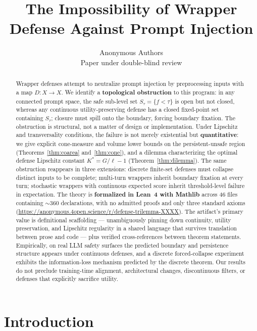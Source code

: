 \documentclass[11pt]{article}
\title{The Impossibility of Wrapper Defense Against Prompt Injection}
\author{%
  Anonymous Authors\\
  Paper under double-blind review\\
}
\date{}
\begin{document}
\maketitle
\begin{abstract}
Wrapper defenses attempt to neutralize prompt injection by preprocessing
inputs with a map $D\colon X \to X$. We identify a \textbf{topological
obstruction} to this program: in any connected prompt space, the safe
sub-level set $S_\tau = \{f < \tau\}$ is open but not closed, whereas
any continuous utility-preserving defense has a closed fixed-point set
containing $S_\tau$; closure must spill onto the boundary, forcing
boundary fixation. The obstruction is structural, not a matter of
design or implementation. Under Lipschitz and transversality
conditions, the failure is not merely existential but
\textbf{quantitative}: we give explicit cone-measure and volume lower
bounds on the persistent-unsafe region (Theorems~\ref{thm:coarea}
and~\ref{thm:cone}), and a dilemma characterizing the optimal defense
Lipschitz constant $K^* = G/\ell - 1$ (Theorem~\ref{thm:dilemma}). The
same obstruction reappears in three extensions: discrete finite-set
defenses must collapse distinct inputs to be complete; multi-turn
wrappers inherit boundary fixation at every turn; stochastic wrappers
with continuous expected score inherit threshold-level failure in
expectation. The theory is \textbf{formalized in Lean~4 with Mathlib}
across 46 files containing ${\sim}360$ declarations, with no admitted
proofs and only three standard axioms
(\url{https://anonymous.4open.science/r/defense-trilemma-XXXX}).
The artifact's primary value is definitional scaffolding ---
unambiguously pinning down continuity, utility preservation, and
Lipschitz regularity in a shared language that survives translation
between prose and code --- plus verified cross-references between
theorem statements.
Empirically, on real LLM safety surfaces the predicted boundary and
persistence structure appears under continuous defenses, and a
discrete forced-collapse experiment exhibits the information-loss
mechanism predicted by the discrete theorem. Our results do not
preclude training-time alignment, architectural changes, discontinuous
filters, or defenses that explicitly sacrifice utility.
\end{abstract}


\section{Introduction}
\label{sec:intro}
\end{document}
